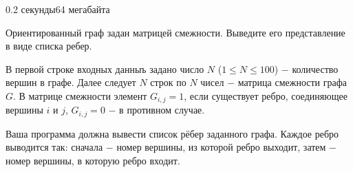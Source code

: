 \begin{problem}{}{}{}{0.2 секунды}{64 мегабайта}

Ориентированный граф задан матрицей смежности. Выведите его представление в виде списка ребер.

\InputFile
В первой строке входных данныъ задано число $N$ ($1 \le N \le 100$) $-$ количество вершин в графе.
Далее следует $N$ строк по $N$ чисел $-$ матрица смежности графа $G$. В матрице смежности элемент $G_{i,j}=1$, если
существует ребро, соединяющее вершины $i$ и $j$, $G_{i,j}=0$ $-$ в противном случае.

\OutputFile
Ваша программа должна вывести список рёбер заданного графа. Каждое ребро выводится так: сначала $-$
номер вершины, из которой ребро выходит, затем $-$ номер вершины, в которую ребро входит.

\Example

\begin{example}
%
\end{example}

\end{problem}

